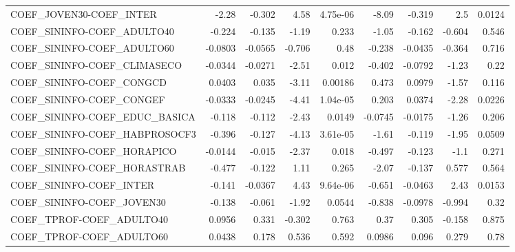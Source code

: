 \begin{tabular}{lrrrrrrrr}
COEF\_JOVEN30-COEF\_INTER               &       -2.28 &       -0.302 &    4.58 & 4.75e-06 &      -8.09 &      -0.319 &          2.5 &        0.0124 \\
COEF\_SININFO-COEF\_ADULTO40            &      -0.224 &       -0.135 &   -1.19 &    0.233 &      -1.05 &      -0.162 &       -0.604 &         0.546 \\
COEF\_SININFO-COEF\_ADULTO60            &     -0.0803 &      -0.0565 &  -0.706 &     0.48 &     -0.238 &     -0.0435 &       -0.364 &         0.716 \\
COEF\_SININFO-COEF\_CLIMASECO           &     -0.0344 &      -0.0271 &   -2.51 &    0.012 &     -0.402 &     -0.0792 &        -1.23 &          0.22 \\
COEF\_SININFO-COEF\_CONGCD              &      0.0403 &        0.035 &   -3.11 &  0.00186 &      0.473 &      0.0979 &        -1.57 &         0.116 \\
COEF\_SININFO-COEF\_CONGEF              &     -0.0333 &      -0.0245 &   -4.41 & 1.04e-05 &      0.203 &      0.0374 &        -2.28 &        0.0226 \\
COEF\_SININFO-COEF\_EDUC\_BASICA         &      -0.118 &       -0.112 &   -2.43 &   0.0149 &    -0.0745 &     -0.0175 &        -1.26 &         0.206 \\
COEF\_SININFO-COEF\_HABPROSOCF3         &      -0.396 &       -0.127 &   -4.13 & 3.61e-05 &      -1.61 &      -0.119 &        -1.95 &        0.0509 \\
COEF\_SININFO-COEF\_HORAPICO            &     -0.0144 &       -0.015 &   -2.37 &    0.018 &     -0.497 &      -0.123 &         -1.1 &         0.271 \\
COEF\_SININFO-COEF\_HORASTRAB           &      -0.477 &       -0.122 &    1.11 &    0.265 &      -2.07 &      -0.137 &        0.577 &         0.564 \\
COEF\_SININFO-COEF\_INTER               &      -0.141 &      -0.0367 &    4.43 & 9.64e-06 &     -0.651 &     -0.0463 &         2.43 &        0.0153 \\
COEF\_SININFO-COEF\_JOVEN30             &      -0.138 &       -0.061 &   -1.92 &   0.0544 &     -0.838 &     -0.0978 &       -0.994 &          0.32 \\
COEF\_TPROF-COEF\_ADULTO40              &      0.0956 &        0.331 &  -0.302 &    0.763 &       0.37 &       0.305 &       -0.158 &         0.875 \\
COEF\_TPROF-COEF\_ADULTO60              &      0.0438 &        0.178 &   0.536 &    0.592 &     0.0986 &       0.096 &        0.279 &          0.78 \\

\end{tabular}
